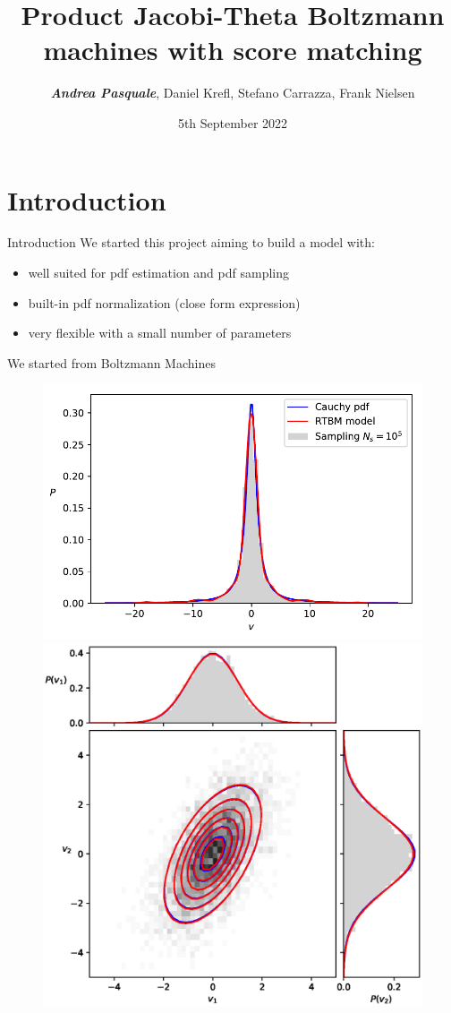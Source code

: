 \documentclass[10pt]{beamer}
\title{Product Jacobi-Theta Boltzmann machines with score matching}
\subtitle{}
\author{\textit{\textbf{Andrea Pasquale}}, Daniel Krefl, Stefano Carrazza, Frank Nielsen}
\date{5th September 2022}
\begin{document}
\maketitle

\section{Introduction}

\begin{frame}{Introduction}
    We started this project aiming to build a model with:
    \begin{itemize}
        \item well suited for pdf estimation and pdf sampling 
        \item built-in pdf normalization (close form expression)
        \item very flexible with a small number of parameters
    \end{itemize}
    We started from Boltzmann Machines
    \begin{figure}
        \begin{center}
            \includegraphics[scale=0.5]{figures/cauchy.pdf}
            \includegraphics[scale=0.4]{figures/Gaussian2d.eps}

\end{center}
\end{figure}
\end{frame}
\end{document}
